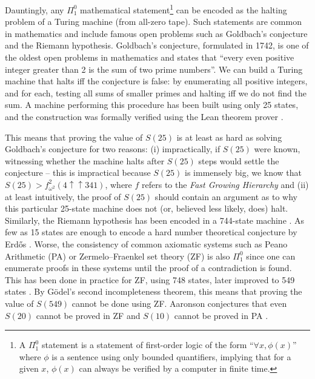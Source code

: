 \documentclass[a4paper,british]{article}
\theoremstyle{definition} %
\numberwithin{equation}{section}
\theoremstyle{definition} %
\begin{document}
Dauntingly, any $\Pi_1^0$ mathematical statement\footnote{A $\Pi_1^0$ statement is a statement of first-order logic of the form ``$\forall x, \phi(x)$'' where $\phi$ is a sentence using only bounded quantifiers, implying that for a given $x$, $\phi(x)$ can always be verified by a computer in finite time.} can be encoded as the halting problem of a Turing machine (from all-zero tape). Such statements are common in mathematics and include famous open problems such as Goldbach's conjecture and the Riemann hypothesis. Goldbach's conjecture, formulated in 1742, is one of the oldest open problems in mathematics and states that ``every even positive integer greater than 2 is the sum of two prime numbers''. We can build a Turing machine that halts iff the conjecture is false: by enumerating all positive integers, and for each, testing all sums of smaller primes and halting iff we do not find the sum. A machine performing this procedure has been built using only 25 states, and the construction was formally verified using the Lean theorem prover \cite{GoldbachTM27, GoldbachTM25, DeMouraKongAvigadVanDoornvonRaumer}.

This means that proving the value of $S(25)$ is at least as hard as solving Goldbach's conjecture for two reasons: (i) impractically, if $S(25)$ were known, witnessing whether the machine halts after $S(25)$ steps would settle the conjecture -- this is impractical because $S(25)$ is immensely big, we know that $S(25) > f^2_{\omega^2}(4 \uparrow \uparrow 341)$, where $f$ refers to the \textit{Fast Growing Hierarchy} \cite{wikiChampions,wainer1970classification} and (ii) at least intuitively, the proof of $S(25)$ should contain an argument as to why this particular 25-state machine does not (or, believed less likely, does) halt. Similarly, the Riemann hypothesis has been encoded in a 744-state machine \cite{RiemannTM,Yedidia2016,BusyBeaverFrontier}. As few as 15 states are enough to encode a hard number theoretical conjecture by Erd\H{o}s \cite{BB15}. Worse, the consistency of common axiomatic systems such as Peano Arithmetic (PA) or Zermelo–Fraenkel set theory (ZF) is also $\Pi_1^0$ since one can enumerate proofs in these systems until the proof of a contradiction is found. This has been done in practice for ZF, using 748 states, later improved to 549 states \cite{wade2025alignment, ZFTM,Yedidia2016,BusyBeaverFrontier,BB748Thesis}. By G\"odel's second incompleteness theorem, this means that proving the value of $S(549)$ cannot be done using ZF. Aaronson conjectures that even $S(20)$ cannot be proved in ZF and $S(10)$ cannot be proved in PA \cite{BusyBeaverFrontier}.
\end{document}
